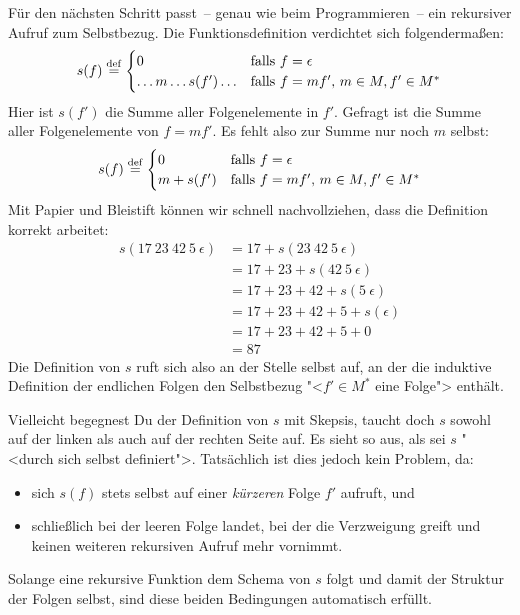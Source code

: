 Für den nächsten Schritt passt~-- genau wie beim Programmieren~-- ein
rekursiver Aufruf zum Selbstbezug. Die Funktionsdefinition verdichtet sich
folgendermaßen:
%
\begin{displaymath}
  s(f) \stackrel{\rm def}{=}
  \begin{cases}
    0 & \textrm{falls $f = \epsilon$}\\
    \ldots m \ldots s(f') \ldots & \textrm{falls $f = mf'$, $m\in M, f'\in M^\ast$}
  \end{cases}
\end{displaymath}
%
Hier ist $s(f')$ die Summe aller
Folgenelemente in $f'$.  Gefragt ist die Summe aller Folgenelemente
von $f = mf'$.  Es fehlt also zur Summe nur noch $m$ selbst:
%
\begin{displaymath}
  s(f) \stackrel{\rm def}{=}
  \begin{cases}
    0 & \textrm{falls $f = \epsilon$}\\
    m + s(f') & \textrm{falls $f = mf'$, $m\in M, f'\in M^\ast$}
  \end{cases}
\end{displaymath}
%
Mit Papier und Bleistift können wir schnell nachvollziehen, dass die
Definition korrekt arbeitet:
%
\begin{displaymath}
  \begin{split}
  s(17~23~42~5~\epsilon) &= 17 + s(23~42~5~\epsilon)
  \\
  &= 17 + 23 + s(42~5~\epsilon)
  \\
  &= 17 + 23 + 42 + s(5~\epsilon)
  \\
  &= 17 + 23 + 42 + 5 + s(\epsilon)
  \\
  &= 17 + 23 + 42 + 5 + 0
  \\
  &= 87
\end{split}
\end{displaymath}
% 
Die Definition von $s$ ruft sich also an der Stelle selbst auf,
an der die induktive Definition der endlichen Folgen den Selbstbezug
"<$f' \in M^\ast$ eine Folge"> enthält.  

Vielleicht begegnest Du der Definition von $s$ mit Skepsis, taucht
doch $s$ sowohl auf der linken als auch auf der rechten Seite auf.  Es
sieht so aus, als sei $s$ "<durch sich selbst definiert">.
Tatsächlich ist dies jedoch kein Problem, da:
%
\begin{itemize}
\item sich $s(f)$ stets selbst auf einer \emph{kürzeren} Folge
  $f'$ aufruft, und
\item schließlich bei der leeren Folge landet, bei der die Verzweigung
  greift und keinen weiteren rekursiven Aufruf mehr vornimmt.
\end{itemize}
%
Solange eine rekursive Funktion dem Schema von $s$ folgt und damit der
Struktur der Folgen selbst, sind diese beiden Bedingungen automatisch
erfüllt.

